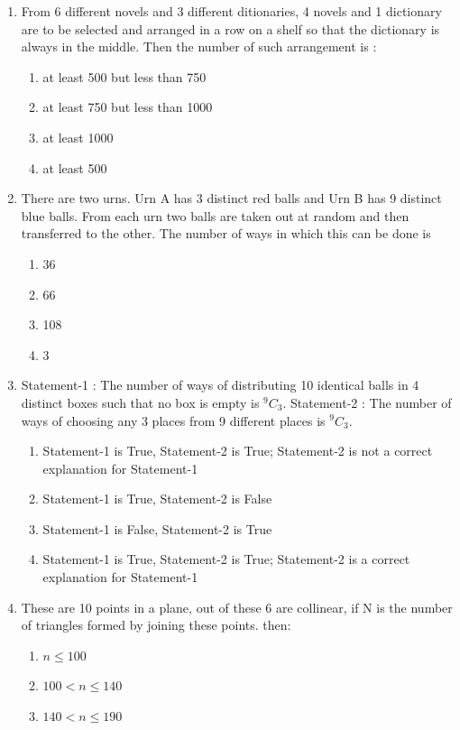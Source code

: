 \documentclass[journal,12pt,twocolumn]{IEEEtran}
\newcommand*{\Comb}[2]{{}^{#1}C_{#2}}%
\begin{document}
\begin{enumerate}
\item From 6 different novels and 3 different ditionaries, 4 novels and 1 dictionary are to be selected and arranged in a row on a shelf so that the dictionary is always in the middle. Then the number of such arrangement is :
\begin{enumerate}
\item at least 500 but less than 750
\item at least 750 but less than 1000
\item at least 1000
\item at least 500\\ 
\end{enumerate}
\item There are two urns. Urn A has 3 distinct red balls and Urn B has 9 distinct blue balls. From each urn two balls are taken out at random and then transferred to the other. The number of ways in which this can be done is
\begin{enumerate}
\item 36
\item 66 
\item 108
\item 3\\
\end{enumerate}
\item Statement-1 :  The number of ways of distributing 10 identical balls in 4 distinct boxes such that no box is empty is $\Comb{9}{3}$.
Statement-2 : The number of ways of choosing any 3 places from 9 different places is $\Comb{9}{3}$.
\begin{enumerate}
\item Statement-1 is True, Statement-2 is True; Statement-2 is not a correct explanation for Statement-1
\item Statement-1 is True, Statement-2 is False
\item Statement-1 is False, Statement-2 is True
\item Statement-1 is True, Statement-2 is True; Statement-2 is a correct explanation for Statement-1\\
\end{enumerate} 
\item These are 10 points in a plane, out of these 6 are collinear, if N is the number of triangles formed by joining these points. then:
\begin{enumerate}
\item $n \leq 100$
\item $100 < n \leq 140$
\item $140 < n \leq 190$

\end{enumerate}
\end{enumerate}
\end{document}

